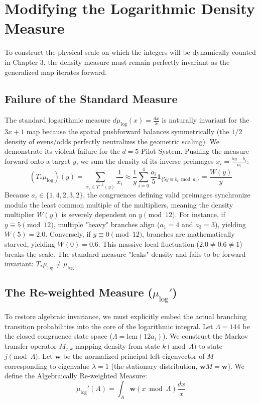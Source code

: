 \chapter{Modifying the Logarithmic Density Measure}

To construct the physical scale on which the integers will be dynamically counted in Chapter 3, the density measure must remain perfectly invariant as the generalized map iterates forward.

\section{Failure of the Standard Measure}

The standard logarithmic measure $d\mu_{\log}(x) = \frac{dx}{x}$ is naturally invariant for the $3x+1$ map because the spatial pushforward balances symmetrically (the $1/2$ density of evens/odds perfectly neutralizes the geometric scaling). We demonstrate its violent failure for the $d=5$ Pilot System. Pushing the measure forward onto a target $y$, we sum the density of its inverse preimages $x_i = \frac{5y - b_i}{a_i}$:
$$ (T_* \mu_{\log})(y) = \sum_{x_i \in T^{-1}(y)} \frac{1}{x_i} \approx \frac{1}{y} \sum_{i=0}^4 \frac{a_i}{5} \mathbf{1}_{\{5y \equiv b_i \bmod a_i\}} = \frac{W(y)}{y} $$
Because $a_i \in \{1, 4, 2, 3, 2\}$, the congruences defining valid preimages synchronize modulo the least common multiple of the multipliers, meaning the density multiplier $W(y)$ is severely dependent on $y \pmod{12}$. For instance, if $y \equiv 5 \pmod{12}$, multiple "heavy" branches align ($a_1=4$ and $a_3=3$), yielding $W(5) = 2.0$. Conversely, if $y \equiv 0 \pmod{12}$, branches are mathematically starved, yielding $W(0) = 0.6$. This massive local fluctuation ($2.0 \neq 0.6 \neq 1$) breaks the scale. The standard measure "leaks" density and fails to be forward invariant: $T_* \mu_{\log} \neq \mu_{\log}$.

\section{The Re-weighted Measure ($\mu_{\log}'$)}

To restore algebraic invariance, we must explicitly embed the actual branching transition probabilities into the core of the logarithmic integral. Let $\Lambda = 144$ be the closed congruence state space ($\Lambda = \text{lcm}(12 a_i)$). We construct the Markov transfer operator $M_{j,k}$ mapping density from state $k \pmod{\Lambda}$ to state $j \pmod{\Lambda}$. Let $\mathbf{w}$ be the normalized principal left-eigenvector of $M$ corresponding to eigenvalue $\lambda = 1$ (the stationary distribution, $\mathbf{w}M = \mathbf{w}$). We define the Algebraically Re-weighted Measure:
$$ \mu_{\log}'(A) = \int_{A} \mathbf{w}(x \bmod \Lambda) \frac{dx}{x} $$

